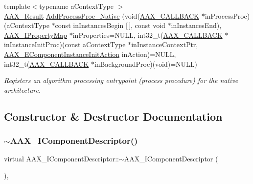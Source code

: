 \begin{DoxyCompactItemize}
{\footnotesize template$<$typename a\+Context\+Type $>$ }\\\mbox{\hyperlink{a00392_a4d8f69a697df7f70c3a8e9b8ee130d2f}{A\+A\+X\+\_\+\+Result}} \mbox{\hyperlink{a01781_a985d1aeb83e4e3065ac2ff4047c3e410}{Add\+Process\+Proc\+\_\+\+Native}} (void(\mbox{\hyperlink{a00392_aaa22112139aa627574b1ef562f579d43}{A\+A\+X\+\_\+\+C\+A\+L\+L\+B\+A\+CK}} $\ast$in\+Process\+Proc)(a\+Context\+Type $\ast$const in\+Instances\+Begin \mbox{[}$\,$\mbox{]}, const void $\ast$in\+Instances\+End), \mbox{\hyperlink{a01869}{A\+A\+X\+\_\+\+I\+Property\+Map}} $\ast$in\+Properties=N\+U\+LL, int32\+\_\+t(\mbox{\hyperlink{a00392_aaa22112139aa627574b1ef562f579d43}{A\+A\+X\+\_\+\+C\+A\+L\+L\+B\+A\+CK}} $\ast$in\+Instance\+Init\+Proc)(const a\+Context\+Type $\ast$in\+Instance\+Context\+Ptr, \mbox{\hyperlink{a00491_aff5646376a3c93f032cf2400e0885023}{A\+A\+X\+\_\+\+E\+Component\+Instance\+Init\+Action}} in\+Action)=N\+U\+LL, int32\+\_\+t(\mbox{\hyperlink{a00392_aaa22112139aa627574b1ef562f579d43}{A\+A\+X\+\_\+\+C\+A\+L\+L\+B\+A\+CK}} $\ast$in\+Background\+Proc)(void)=N\+U\+LL)
\begin{DoxyCompactList}\small\item\em Registers an algorithm processing entrypoint (process procedure) for the native architecture. \end{DoxyCompactList}\end{DoxyCompactItemize}


\subsection{Constructor \& Destructor Documentation}
\mbox{\label{a01781_a15a049b75d57c81d6201c18c6800a6da}} 
\subsubsection{\texorpdfstring{$\sim$AAX\_IComponentDescriptor()}{~AAX\_IComponentDescriptor()}}
{\footnotesize\ttfamily virtual A\+A\+X\+\_\+\+I\+Component\+Descriptor\+::$\sim$\+A\+A\+X\+\_\+\+I\+Component\+Descriptor (\begin{DoxyParamCaption}{ }\end{DoxyParamCaption})\hspace{0.3cm}{\ttfamily [inline]}, {\ttfamily [virtual]}}



